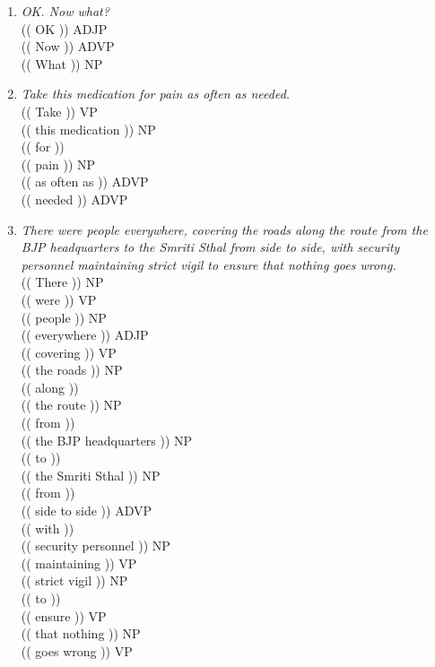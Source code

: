 \documentclass[11pt,a4paper,twocolumn]{article}
\begin{document}
\begin{enumerate}
	\item \textit{OK. Now what?}\\
	$ $\\
	\textcolor{diff}{(( OK ))} ADJP\\
	\textcolor{diff}{(( Now ))} ADVP\\
	\textcolor{diff}{(( What ))} NP\\
	
	\item \textit{Take this medication for pain as often as needed.}\\
	$ $\\
	\textcolor{diff}{(( Take ))} VP\\
	\textcolor{diff}{(( this medication ))} NP\\
	\textcolor{diff}{(( for ))} \\
	\textcolor{diff}{(( pain ))} NP\\
	\textcolor{diff}{(( as often as ))} ADVP\\
	\textcolor{diff}{(( needed ))} ADVP\\
	
	\item \textit{There were people everywhere, covering the 
	roads along the route from the BJP headquarters to the Smriti 
	Sthal from side to side, with security personnel maintaining 
	strict vigil to ensure that nothing goes wrong.}\\
	$ $\\
	\textcolor{diff}{(( There ))} NP\\	
	\textcolor{diff}{(( were ))} VP\\	
	\textcolor{diff}{(( people ))} NP\\
	\textcolor{diff}{(( everywhere ))} ADJP\\
	\textcolor{diff}{(( covering ))} VP\\
	\textcolor{diff}{(( the roads ))} NP\\
	\textcolor{diff}{(( along ))} \\
	\textcolor{diff}{(( the route ))} NP\\
	\textcolor{diff}{(( from ))} \\
	\textcolor{diff}{(( the BJP headquarters ))} NP\\
	\textcolor{diff}{(( to ))} \\
	\textcolor{diff}{(( the Smriti Sthal ))} NP\\
	\textcolor{diff}{(( from ))} \\
	\textcolor{diff}{(( side to side ))} ADVP\\
	\textcolor{diff}{(( with ))} \\
	\textcolor{diff}{(( security personnel ))} NP\\
	\textcolor{diff}{(( maintaining ))} VP\\
	\textcolor{diff}{(( strict vigil ))} NP\\
	\textcolor{diff}{(( to ))} \\
	\textcolor{diff}{(( ensure ))} VP\\
	\textcolor{diff}{(( that nothing ))} NP\\
	\textcolor{diff}{(( goes wrong ))} VP\\
	


\end{enumerate}
\end{document}
